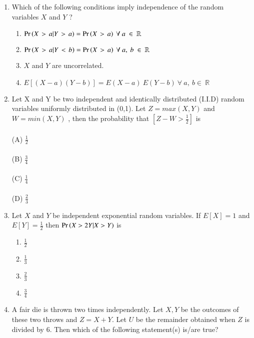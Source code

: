 \begin{enumerate}[label=\thesection.\arabic*.,ref=\thesection.\theenumi]
\item Which of the following conditions imply independence of the random variables $X$
and $Y$ ?
\begin{enumerate}
    \item  $\pr{X\ \mathop{>}\ a|Y\ \mathop{>}\ a} = \pr{X\ \mathop{>}\ a}\ \forall\ a\ \in\ \mathbb{R}$\\ 
    \item  $\pr{X\ \mathop{>}\ a|Y\ \mathop{<}\ b} = \pr{X\ \mathop{>}\ a}\ \forall\ a,\ b\ \in\ \mathbb{R}$\\ 
    \item  $X$ and $Y$ are uncorrelated.\\
    \item  $E[(X-a)(Y-b)] = E(X-a)\ E(Y-b)\ \forall\ a,\ b \in\ \mathbb{R}$\\
\end{enumerate}
%
\solution
%

%
\item Let X and Y be two independent and identically distributed (I.I.D) random variables uniformly distributed in (0,1). Let $Z = max(X,Y)$ and $W = min(X,Y)$ , then the probability that $[Z-W >\frac{1}{2}]$ is\\
\\(A) $\frac{1}{2}$\\
\\(B) $\frac{3}{4}$\\
\\(C) $\frac{1}{4}$\\
\\(D) $\frac{2}{3}$    
%
\solution

%
%
\item Let $X$ and $Y$ be independent exponential random variables. If $E[X]=1$ and $E[Y]=\frac{1}{2}$ then $\Pr\left(X>2Y|X>Y\right)$ is
\begin{multicols}{2}
    \begin{enumerate}[label=\arabic*.]
        \item \Large$\frac{1}{2}$ \\
        \item $\frac{1}{3}$
        \item $\frac{2}{3}$ \\
        \item $\frac{3}{4}$
    \end{enumerate}
\end{multicols}
%
\solution

%
%
\item A fair die is thrown two times independently. Let $X,Y$ be the outcomes of these two throws and $Z=X+Y$. Let $U$ be the remainder obtained when $Z$ is divided by 6. Then which of the following statement(s) is/are true?

\end{enumerate}
